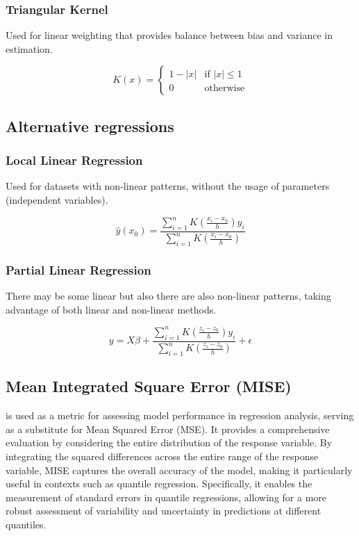 \documentclass[]{article}
\begin{document}
	
	\subsubsection{Triangular Kernel}
	Used for linear weighting that provides balance between bias and variance in estimation.
	
	$$
	K(x) = 
	\begin{cases} 
		1 - |x| & \text{if } |x| \leq 1 \\
		0 & \text{otherwise}
	\end{cases}
	$$
	
	\subsection{Alternative regressions}
	
	\subsubsection{Local Linear Regression}
	Used for datasets with non-linear patterns, without the usage of parameters (independent variables). 
	
	$$
	\hat{y}(x_0) = \frac{\sum_{i=1}^{n} K\left(\frac{x_i - x_0}{h}\right) y_i}{\sum_{i=1}^{n} K\left(\frac{x_i - x_0}{h}\right)}
	$$
	
	\subsubsection{Partial Linear Regression}
	There may be some linear but also there are also non-linear patterns, taking advantage of both linear and non-linear methods.
	
	$$ 	y = X\beta + \frac{\sum_{i=1}^{n} K\left(\frac{z_i - z_0}{h}\right) y_i}{\sum_{i=1}^{n} K\left(\frac{z_i - z_0}{h}\right)} + \epsilon$$

	\subsection{Mean Integrated Square Error (MISE)}
	is used as a metric for assessing model performance in regression analysis, serving as a substitute for Mean Squared Error (MSE). It provides a comprehensive evaluation by considering the entire distribution of the response variable. By integrating the squared differences across the entire range of the response variable, MISE captures the overall accuracy of the model, making it particularly useful in contexts such as quantile regression. Specifically, it enables the measurement of standard errors in quantile regressions, allowing for a more robust assessment of variability and uncertainty in predictions at different quantiles.
	
\end{document}
